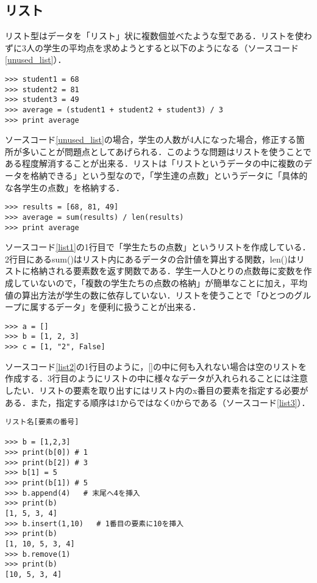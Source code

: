 \subsection{リスト}
リスト型はデータを「リスト」状に複数個並べたような型である．リストを使わずに3人の学生の平均点を求めようとすると以下のようになる（ソースコード\ref{unused_list}）．
\begin{lstlisting}[caption=リストを使わない場合, label=unused_list]
>>> student1 = 68
>>> student2 = 81
>>> student3 = 49
>>> average = (student1 + student2 + student3) / 3
>>> print average
\end{lstlisting}
ソースコード\ref{unused_list}の場合，学生の人数が4人になった場合，修正する箇所が多いことが問題点としてあげられる．このような問題はリストを使うことである程度解消することが出来る．リストは「リストというデータの中に複数のデータを格納できる」という型なので，「学生達の点数」というデータに「具体的な各学生の点数」を格納する．
\begin{lstlisting}[caption=リストを使った場合, label=list1]
>>> results = [68, 81, 49]
>>> average = sum(results) / len(results)
>>> print average
\end{lstlisting}
ソースコード\ref{list1}の1行目で「学生たちの点数」というリストを作成している．2行目にあるsum()はリスト内にあるデータの合計値を算出する関数，len()はリストに格納される要素数を返す関数である．学生一人ひとりの点数毎に変数を作成していないので，「複数の学生たちの点数の格納」が簡単なことに加え，平均値の算出方法が学生の数に依存していない．リストを使うことで「ひとつのグループに属するデータ」を便利に扱うことが出来る．
\begin{lstlisting}[caption=リストの使い方1, label=list2]
>>> a = []
>>> b = [1, 2, 3]
>>> c = [1, "2", False]
\end{lstlisting}
ソースコード\ref{list2}の1行目のように，[]の中に何も入れない場合は空のリストを作成する．3行目のようにリストの中に様々なデータが入れられることには注意したい．リストの要素を取り出すにはリスト内のx番目の要素を指定する必要がある．また，指定する順序は1からではなく0からである（ソースコード\ref{list3}）．
\begin{lstlisting}[caption=リストの使い方2, label=list3]
リスト名[要素の番号]

>>> b = [1,2,3]
>>> print(b[0]) # 1
>>> print(b[2]) # 3
>>> b[1] = 5
>>> print(b[1]) # 5
>>> b.append(4)   # 末尾へ4を挿入
>>> print(b)
[1, 5, 3, 4]
>>> b.insert(1,10)   # 1番目の要素に10を挿入
>>> print(b)
[1, 10, 5, 3, 4]
>>> b.remove(1)
>>> print(b)
[10, 5, 3, 4]
\end{lstlisting}


